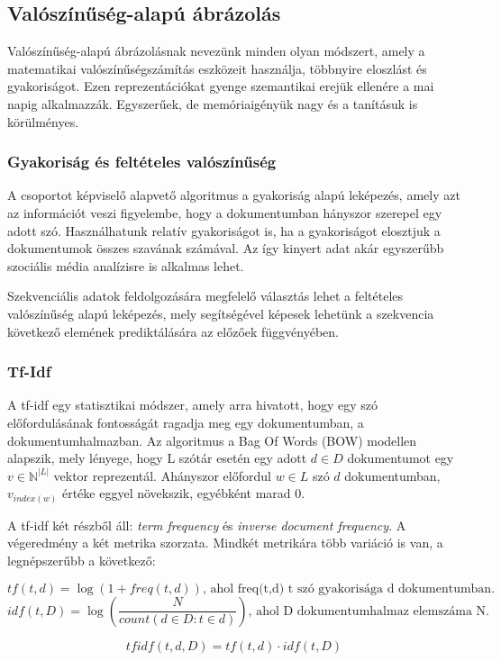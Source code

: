 \subsection{Valószínűség-alapú ábrázolás}

Valószínűség-alapú ábrázolásnak nevezünk minden olyan módszert, amely a matematikai valószínűségszámítás eszközeit használja, többnyire eloszlást és gyakoriságot. Ezen reprezentációkat gyenge szemantikai erejük ellenére a mai napig alkalmazzák. Egyszerűek, de memóriaigényük nagy és a tanításuk is körülményes.

\subsubsection{Gyakoriság és feltételes valószínűség}

A csoportot képviselő alapvető algoritmus a gyakoriság alapú leképezés, amely azt az információt veszi figyelembe, hogy a dokumentumban hányszor szerepel egy adott szó. Használhatunk relatív gyakoriságot is, ha a gyakoriságot elosztjuk a dokumentumok összes szavának számával. Az így kinyert adat akár egyszerűbb szociális média analízisre is alkalmas lehet.

Szekvenciális adatok feldolgozására megfelelő választás lehet a feltételes valószínűség alapú leképezés, mely segítségével képesek lehetünk a szekvencia következő elemének prediktálására az előzőek függvényében.


\subsubsection{Tf-Idf}

A tf-idf egy statisztikai módszer, amely arra hivatott, hogy egy szó előfordulásának fontosságát ragadja meg egy dokumentumban, a dokumentumhalmazban. Az algoritmus a Bag Of Words (BOW) modellen alapszik, mely lényege, hogy L szótár esetén egy adott $d \in D$ dokumentumot egy $v \in \mathbb{N}^{|L|}$ vektor reprezentál. Ahányszor előfordul $w \in L$ szó $d$ dokumentumban, $v_{index(w)}$ értéke eggyel növekszik, egyébként marad 0. 

A tf-idf két részből áll: \textit{term frequency} és \textit{inverse document frequency}. A végeredmény a két metrika szorzata. Mindkét metrikára több variáció is van, a legnépszerűbb a következő:

\begin{definition}
$$tf\left(t,d\right) = \log \left( 1 + freq\left(t,d\right)\right) \text{, ahol freq(t,d) t szó gyakorisága d dokumentumban.}$$
$$idf\left(t,D\right) = \log \left( \frac{N}{count \left( d \in D:t \in d \right) } \right) \text{, ahol D dokumentumhalmaz elemszáma N.}$$

$$tfidf(t,d,D) = tf(t,d) \cdot idf(t,D)$$

\end{definition}


